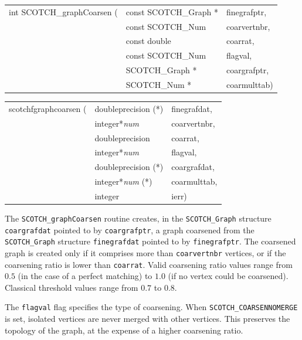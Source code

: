 \begin{itemize}
\progsyn

{\tt\begin{tabular}{l@{}ll}
int SCOTCH\_graphCoarsen ( & const SCOTCH\_Graph * & finegrafptr, \\
                           & const SCOTCH\_Num     & coarvertnbr, \\
                           & const double          & coarrat,     \\
                           & const SCOTCH\_Num     & flagval,     \\
                           & SCOTCH\_Graph *       & coargrafptr, \\
                           & SCOTCH\_Num *         & coarmulttab) \\
\end{tabular}}

{\tt\begin{tabular}{l@{}ll}
scotchfgraphcoarsen ( & doubleprecision (*)   & finegrafdat, \\
                      & integer*{\it num}     & coarvertnbr, \\
                      & doubleprecision       & coarrat,     \\
                      & integer*{\it num}     & flagval,     \\
                      & doubleprecision (*)   & coargrafdat, \\
                      & integer*{\it num} (*) & coarmulttab, \\
                      & integer               & ierr)
\end{tabular}}

\progdes

The {\tt SCOTCH\_graphCoarsen} routine creates, in the
{\tt SCOTCH\_\lbt Graph} structure {\tt coar\lbt graf\lbt dat} pointed
to by {\tt coar\lbt graf\lbt ptr}, a graph coarsened from the
{\tt SCOTCH\_\lbt Graph} structure {\tt fine\lbt graf\lbt dat} pointed
to by {\tt fine\lbt graf\lbt ptr}. The coarsened graph is created only
if it comprises more than {\tt coar\lbt vert\lbt nbr} vertices, or if
the coarsening ratio is lower than {\tt coarrat}. Valid coarsening
ratio values range from $0.5$ (in the case of a perfect matching) to
$1.0$ (if no vertex could be coarsened). Classical threshold values
range from $0.7$ to $0.8$.

The {\tt flagval} flag specifies the type of coarsening.
When {\tt SCOTCH\_\lbt COARSEN\lbt NO\lbt MERGE} is set, isolated
vertices are never merged with other vertices. This preserves the
topology of the graph, at the expense of a higher coarsening ratio.


\end{itemize}
